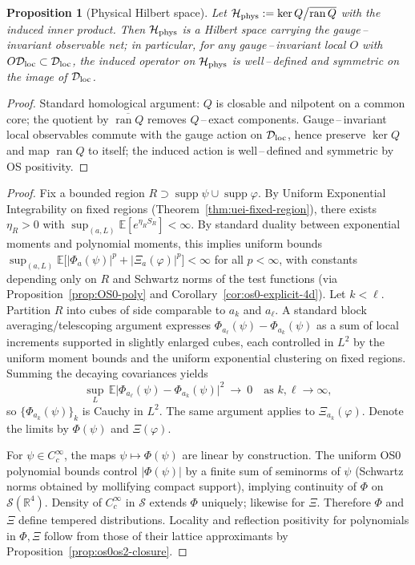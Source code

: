 \documentclass[11pt]{amsart}
\theoremstyle{plain}
\newtheorem{proposition}[theorem]{Proposition}
\theoremstyle{definition}
\theoremstyle{remark}
\begin{document}
\begin{proposition}[Physical Hilbert space]\label{prop:physical-hilbert}
Let $\mathcal H_{\rm phys}:=\ker Q\big/\overline{\operatorname{ran} Q}$ with the induced inner product. Then $\mathcal H_{\rm phys}$ is a Hilbert space carrying the gauge\,–\,invariant observable net; in particular, for any gauge\,–\,invariant local $O$ with $O\mathcal D_{\rm loc}\subset\mathcal D_{\rm loc}$, the induced operator on $\mathcal H_{\rm phys}$ is well\,–\,defined and symmetric on the image of $\mathcal D_{\rm loc}$.
\end{proposition}
\begin{proof}
Standard homological argument: $Q$ is closable and nilpotent on a common core; the quotient by $\overline{\operatorname{ran} Q}$ removes $Q$\,–\,exact components. Gauge\,–\,invariant local observables commute with the gauge action on $\mathcal D_{\rm loc}$, hence preserve $\ker Q$ and map $\operatorname{ran} Q$ to itself; the induced action is well\,–\,defined and symmetric by OS positivity.
\end{proof}
\begin{proof}
Fix a bounded region $R\supset \operatorname{supp}\psi\cup\operatorname{supp}\varphi$. By Uniform Exponential Integrability on fixed regions (Theorem~\ref{thm:uei-fixed-region}), there exists $\eta_R>0$ with $\sup_{(a,L)} \mathbb E[e^{\eta_R S_R}]<\infty$. By standard duality between exponential moments and polynomial moments, this implies uniform bounds $\sup_{(a,L)}\mathbb E\big[|\Phi_a(\psi)|^p+|\Xi_a(\varphi)|^p\big]<\infty$ for all $p<\infty$, with constants depending only on $R$ and Schwartz norms of the test functions (via Proposition~\ref{prop:OS0-poly} and Corollary~\ref{cor:os0-explicit-4d}).
Let $k<\ell$. Partition $R$ into cubes of side comparable to $a_k$ and $a_\ell$. A standard block averaging/telescoping argument expresses $\Phi_{a_\ell}(\psi)-\Phi_{a_k}(\psi)$ as a sum of local increments supported in slightly enlarged cubes, each controlled in $L^2$ by the uniform moment bounds and the uniform exponential clustering on fixed regions. Summing the decaying covariances yields
\[
  \sup_L\,\mathbb E\big|\Phi_{a_\ell}(\psi)-\Phi_{a_k}(\psi)\big|^2\ \longrightarrow\ 0\quad \text{as }k,\ell\to\infty,
\]
so $\{\Phi_{a_k}(\psi)\}_k$ is Cauchy in $L^2$. The same argument applies to $\Xi_{a_k}(\varphi)$. Denote the limits by $\Phi(\psi)$ and $\Xi(\varphi)$.

For $\psi\in C_c^\infty$, the maps $\psi\mapsto \Phi(\psi)$ are linear by construction. The uniform OS0 polynomial bounds control $|\Phi(\psi)|$ by a finite sum of seminorms of $\psi$ (Schwartz norms obtained by mollifying compact support), implying continuity of $\Phi$ on $\mathcal S(\mathbb R^4)$. Density of $C_c^\infty$ in $\mathcal S$ extends $\Phi$ uniquely; likewise for $\Xi$. Therefore $\Phi$ and $\Xi$ define tempered distributions. Locality and reflection positivity for polynomials in $\Phi,\Xi$ follow from those of their lattice approximants by Proposition~\ref{prop:os0os2-closure}.
\end{proof}
\end{document}
